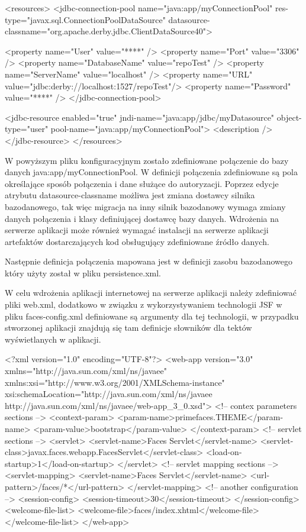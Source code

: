 <resources>
   <jdbc-connection-pool name="java:app/myConnectionPool"
      res-type="javax.sql.ConnectionPoolDataSource"
      datasource-classname="org.apache.derby.jdbc.ClientDataSource40">

      <property name="User" value="****" />
      <property name="Port" value="3306" />
      <property name="DatabaseName" value="repoTest" />
      <property name="ServerName" value="localhost" />
      <property name="URL" value="jdbc:derby://localhost:1527/repoTest"/>
      <property name="Password" value="****" />
   </jdbc-connection-pool>

   <jdbc-resource enabled="true"
      jndi-name="java:app/jdbc/myDatasource"
      object-type="user"
      pool-name="java:app/myConnectionPool">
      <description />
   </jdbc-resource>
</resources>

W powyższym pliku konfiguracyjnym zostało zdefiniowane połączenie do bazy danych java:app/myConnectionPool. W definicji połączenia zdefiniowane są pola określające sposób połączenia i dane służące do autoryzacji. Poprzez edycje atrybutu datasource-classname możliwa jest zmiana dostawcy silnika bazodanowego, tak więc migracja na inny silnik bazodanowy wymaga zmiany danych połączenia i klasy definiującej dostawcę bazy danych. Wdrożenia na serwerze aplikacji może również wymagać instalacji na serwerze aplikacji artefaktów dostarczających kod obsługujący zdefiniowane źródło danych. 

Następnie definicja połączenia mapowana jest w definicji zasobu bazodanowego który użyty został w pliku persistence.xml.

W celu wdrożenia aplikacji internetowej na serwerze aplikacji należy zdefiniować pliki web.xml, dodatkowo w związku z wykorzystywaniem technologii JSF w pliku faces-config.xml definiowane są argumenty dla tej technologii, w przypadku stworzonej aplikacji znajdują się tam definicje słowników dla tektów wyświetlanych w aplikacji.


<?xml version="1.0" encoding="UTF-8"?>
<web-app version="3.0" xmlns="http://java.sun.com/xml/ns/javaee" xmlns:xsi="http://www.w3.org/2001/XMLSchema-instance" xsi:schemaLocation="http://java.sun.com/xml/ns/javaee http://java.sun.com/xml/ns/javaee/web-app_3_0.xsd">
	<!-- contex parameters sections -->
    <context-param>
        <param-name>primefaces.THEME</param-name>
        <param-value>bootstrap</param-value>
    </context-param>
	<!-- servlet sections -->
    <servlet>
        <servlet-name>Faces Servlet</servlet-name>
        <servlet-class>javax.faces.webapp.FacesServlet</servlet-class>
        <load-on-startup>1</load-on-startup>
    </servlet>
	<!-- servlet mapping sections -->
    <servlet-mapping>
        <servlet-name>Faces Servlet</servlet-name>
        <url-pattern>/faces/*</url-pattern>
    </servlet-mapping>
	<!-- another configuration -->
    <session-config>
        <session-timeout>30</session-timeout>
    </session-config>
    <welcome-file-list>
        <welcome-file>faces/index.xhtml</welcome-file>
    </welcome-file-list>
</web-app>

